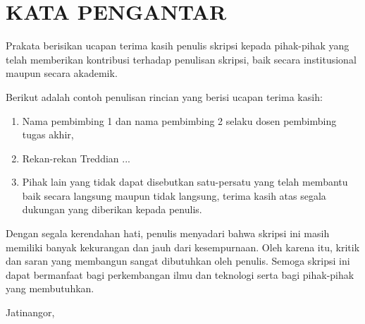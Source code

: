 \chapter*{\centering KATA PENGANTAR}

Prakata berisikan ucapan terima kasih penulis skripsi kepada pihak-pihak yang telah memberikan kontribusi terhadap penulisan skripsi, baik secara institusional maupun secara akademik.

Berikut adalah contoh penulisan rincian yang berisi ucapan terima kasih: 

\begin{enumerate}
	\item Nama pembimbing 1 dan nama pembimbing 2 selaku dosen pembimbing tugas akhir,
	\item Rekan-rekan Treddian ...
	\item Pihak lain yang tidak dapat disebutkan satu-persatu yang telah membantu baik secara langsung maupun tidak langsung, terima kasih atas segala dukungan yang diberikan kepada penulis.
\end{enumerate}

Dengan segala kerendahan hati, penulis menyadari bahwa skripsi ini masih memiliki banyak kekurangan dan jauh dari kesempurnaan. Oleh karena itu, kritik dan saran yang membangun sangat dibutuhkan oleh penulis. Semoga skripsi ini dapat bermanfaat bagi perkembangan ilmu dan teknologi serta bagi pihak-pihak yang membutuhkan.

\vspace{1cm}
\begin{flushright}
	Jatinangor, \dateOf\\
	\vspace{0.5cm}
	\fullName
\end{flushright}